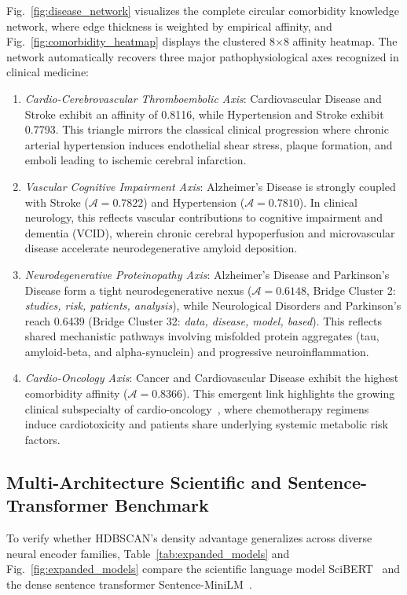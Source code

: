 \documentclass[a4paper,fleqn]{cas-dc}
\begin{document}
Fig.~\ref{fig:disease_network} visualizes the complete circular comorbidity knowledge network, where edge thickness is weighted by empirical affinity, and Fig.~\ref{fig:comorbidity_heatmap} displays the clustered 8$\times$8 affinity heatmap. The network automatically recovers three major pathophysiological axes recognized in clinical medicine:
\begin{enumerate}
\item \textit{Cardio-Cerebrovascular Thromboembolic Axis}: Cardiovascular Disease and Stroke exhibit an affinity of 0.8116, while Hypertension and Stroke exhibit 0.7793. This triangle mirrors the classical clinical progression where chronic arterial hypertension induces endothelial shear stress, plaque formation, and emboli leading to ischemic cerebral infarction.
\item \textit{Vascular Cognitive Impairment Axis}: Alzheimer's Disease is strongly coupled with Stroke ($\mathcal{A}=0.7822$) and Hypertension ($\mathcal{A}=0.7810$). In clinical neurology, this reflects vascular contributions to cognitive impairment and dementia (VCID), wherein chronic cerebral hypoperfusion and microvascular disease accelerate neurodegenerative amyloid deposition.
\item \textit{Neurodegenerative Proteinopathy Axis}: Alzheimer's Disease and Parkinson's Disease form a tight neurodegenerative nexus ($\mathcal{A}=0.6148$, Bridge Cluster 2: \textit{studies, risk, patients, analysis}), while Neurological Disorders and Parkinson's reach 0.6439 (Bridge Cluster 32: \textit{data, disease, model, based}). This reflects shared mechanistic pathways involving misfolded protein aggregates (tau, amyloid-beta, and alpha-synuclein) and progressive neuroinflammation.
\item \textit{Cardio-Oncology Axis}: Cancer and Cardiovascular Disease exhibit the highest comorbidity affinity ($\mathcal{A}=0.8366$). This emergent link highlights the growing clinical subspecialty of cardio-oncology~\cite{ref39}, where chemotherapy regimens induce cardiotoxicity and patients share underlying systemic metabolic risk factors.
\end{enumerate}

\subsection{Multi-Architecture Scientific and Sentence-Transformer Benchmark}

To verify whether HDBSCAN's density advantage generalizes across diverse neural encoder families, Table~\ref{tab:expanded_models} and Fig.~\ref{fig:expanded_models} compare the scientific language model SciBERT~\cite{ref37} and the dense sentence transformer Sentence-MiniLM~\cite{ref38}.
\end{document}
